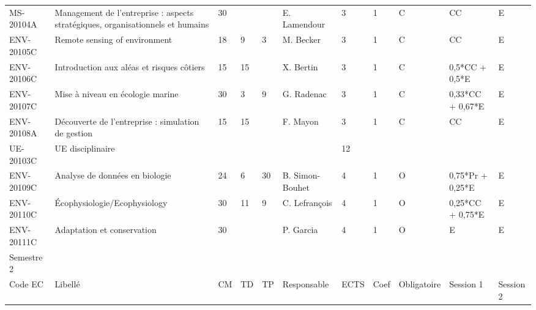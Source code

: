 \documentclass[a4paper,11pt]{article}
\begin{document}
{{\begin{tabular}{lllllllllll}
MS-20104A     & Management de l'entreprise : aspects stratégiques, organisationnels et humains & 30 &    &    & E. Lamendour    & 3    & 1    & C           & CC               & E                \\
ENV-20105C    & Remote sensing of environment                                                  & 18 & 9  & 3  & M. Becker       & 3    & 1    & C           & CC               & E                \\
ENV-20106C    & Introduction aux aléas et risques côtiers                                      & 15 & 15 &    & X. Bertin       & 3    & 1    & C           & 0,5*CC + 0,5*E   & E                \\
ENV-20107C    & Mise à niveau en écologie marine                                               & 30 & 3  & 9  & G. Radenac      & 3    & 1    & C           & 0,33*CC + 0,67*E & E                \\
ENV-20108A    & Découverte de l'entreprise : simulation de gestion                             & 15 & 15 &    & F. Mayon        & 3    & 1    & C           & CC               & E                \\
\rowcolor[HTML]{C0C0C0} 
UE-20103C     & UE disciplinaire                                                               &    &    &    &                 & 12   &      &             &                  &                  \\
ENV-20109C    & Analyse de données en biologie                                                 & 24 & 6  & 30 & B. Simon-Bouhet & 4    & 1    & O           & 0,75*Pr + 0,25*E & E                \\
ENV-20110C    & Écophysiologie/Ecophysiology                                                   & 30 & 11 & 9  & C. Lefrançois   & 4    & 1    & O           & 0,25*CC + 0,75*E & E                \\
ENV-20111C    & Adaptation et conservation                                                     & 30 &    &    & P. Garcia       & 4    & 1    & O           & E                & E                \\
\rowcolor[HTML]{656565} 
Semestre 2    &                                                                                &    &    &    &                 &      &      &             &                  &                  \\
\rowcolor[HTML]{9B9B9B} 
Code EC       & Libellé                                                                        & CM & TD & TP & Responsable     & ECTS & Coef & Obligatoire & Session 1        & Session 2        \\

\end{tabular}}}
\end{document}
